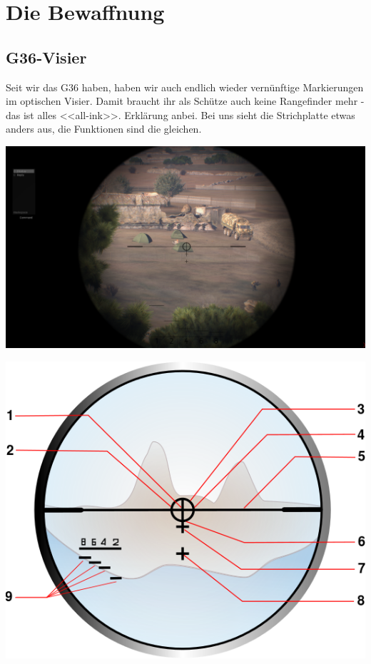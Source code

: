 \newpage
\section{Die Bewaffnung}
\subsection{G36-Visier}
Seit wir das G36 haben, haben wir auch endlich wieder vernünftige Markierungen im optischen Visier. Damit braucht ihr als Schütze auch keine Rangefinder mehr - das ist alles <<all-ink>>. Erklärung anbei. Bei uns sieht die Strichplatte etwas anders aus, die Funktionen sind die gleichen. \\
\begin{minipage}[t]{1\textwidth}
\includegraphics[width=\textwidth]{./Grafiken/Abschnitt/G36_teaser.png}
\end{minipage}
\begin{minipage}[t]{1\textwidth}
\includegraphics[width=\textwidth]{./Grafiken/Abschnitt/G36_Visier.png}
\end{minipage}
